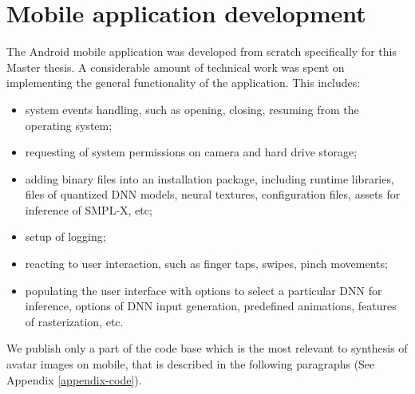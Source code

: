 \section{Mobile application development}
\label{methods:app}

The Android mobile application was developed from scratch specifically for this Master thesis. A considerable amount of technical work was spent on implementing the general functionality of the application. This includes:
\begin{itemize}
	\item system events handling, such as opening, closing, resuming from the operating system;
	\item requesting of system permissions on camera and hard drive storage;
	\item adding binary files into an installation package, including runtime libraries, files of quantized DNN models, neural textures, configuration files, assets for inference of SMPL-X, etc;
	\item setup of logging;
	\item reacting to user interaction, such as finger taps, swipes, pinch movements;
	\item populating the user interface with options to select a  particular DNN for inference, options of DNN input generation, predefined animations, features of rasterization, etc. 
\end{itemize}

We publish only a part of the code base which is the most relevant to synthesis of avatar images on mobile, that is described in the following paragraphs (See Appendix \ref{appendix-code}).

